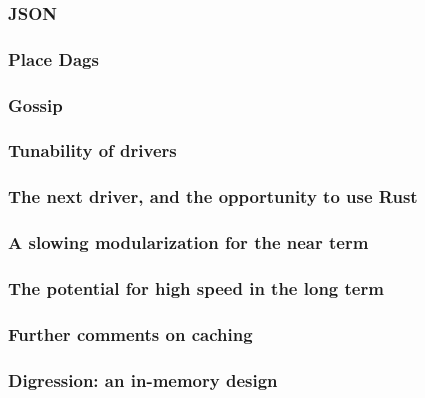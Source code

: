 \subsubsection{JSON}
\label{sec:future:impl:JSON}


\subsubsection{Place Dags}
\label{sec:future:impl:place_dags}


\subsubsection{Gossip}
\label{sec:future:impl:gossip}


\subsubsection{Tunability of drivers}
\label{sec:future:impl:driver_tuning}


\subsubsection{The next driver, and the opportunity to use Rust}
\label{sec:future:impl:rust}


\subsubsection{A slowing modularization for the near term}
\label{sec:future:impl:shortTerm}


\subsubsection{The potential for high speed in the long term}
\label{sec:future:impl:longTerm}


\subsubsection{Further comments on caching}
\label{sec:future:impl:moreCaching}


\subsubsection{Digression: an in-memory design}
\label{sec:future:impl:inMemoryDB}



